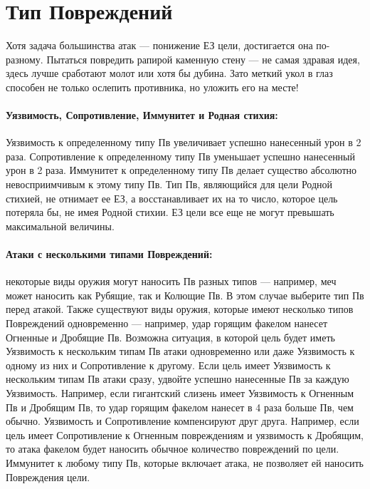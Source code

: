 \section{Тип Повреждений}

\newline
Хотя задача большинства атак — понижение ЕЗ цели, достигается она по-разному. Пытаться повредить рапирой каменную стену — не самая здравая идея, здесь лучше сработают молот или хотя бы дубина. Зато меткий укол в глаз способен не только ослепить противника, но уложить его на месте!
\paragraph{Уязвимость, Сопротивление, Иммунитет и Родная стихия:} Уязвимость к определенному типу Пв увеличивает успешно нанесенный урон в 2 раза. Сопротивление к определенному типу Пв уменьшает успешно нанесенный урон в 2 раза. Иммунитет к определенному типу Пв делает существо абсолютно невосприимчивым к этому типу Пв. Тип Пв, являющийся для цели Родной стихией, не отнимает ее ЕЗ, а восстанавливает их на то число, которое цель потеряла бы, не имея Родной стихии. ЕЗ цели все еще не могут превышать максимальной величины.
\paragraph{Атаки с несколькими типами Повреждений:} некоторые виды оружия могут наносить Пв разных типов — например, меч может наносить как Рубящие, так и Колющие Пв. В этом случае выберите тип Пв перед атакой.
\newline
Также существуют виды оружия, которые имеют несколько типов Повреждений одновременно — например, удар горящим факелом нанесет Огненные и Дробящие Пв. Возможна ситуация, в которой цель будет иметь Уязвимость к нескольким типам Пв атаки одновременно или даже Уязвимость к одному из них и Сопротивление к другому.
\newline
Если цель имеет Уязвимость к нескольким типам Пв атаки сразу, удвойте успешно нанесенные Пв за каждую Уязвимость. Например, если гигантский слизень имеет Уязвимость к Огненным Пв и Дробящим Пв, то удар горящим факелом нанесет в 4 раза больше Пв, чем обычно.
\newline
Уязвимость и Сопротивление компенсируют друг друга. Например, если цель имеет Сопротивление к Огненным повреждениям и уязвимость к Дробящим, то атака факелом будет наносить обычное количество повреждений по цели.
\newline
Иммунитет к любому типу Пв, которые включает атака, не позволяет ей наносить Повреждения цели.
